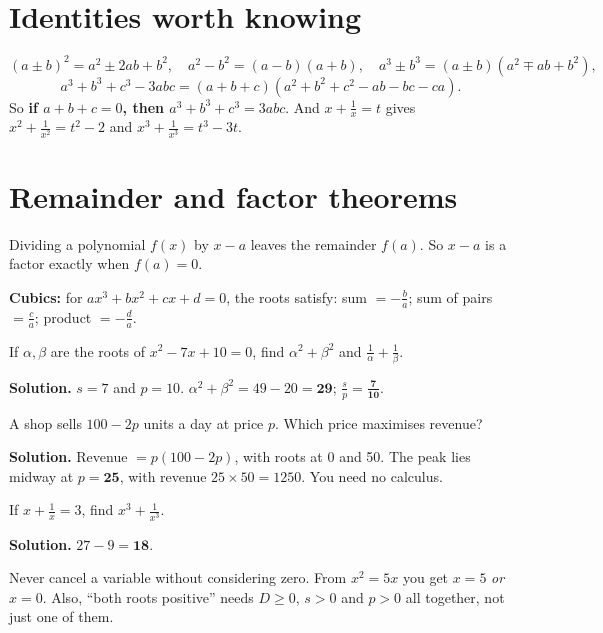 \documentclass[11pt,a4paper,openany]{report}
\begin{document}
\section{Identities worth knowing}
\[(a\pm b)^2=a^2\pm2ab+b^2,\quad a^2-b^2=(a-b)(a+b),\quad a^3\pm b^3=(a\pm b)(a^2\mp ab+b^2),\]
\[a^3+b^3+c^3-3abc=(a+b+c)(a^2+b^2+c^2-ab-bc-ca).\]
So \textbf{if $a+b+c=0$, then $a^3+b^3+c^3=3abc$}. And $x+\frac1x=t$ gives $x^2+\frac1{x^2}=t^2-2$ and $x^3+\frac1{x^3}=t^3-3t$.

\section{Remainder and factor theorems}
Dividing a polynomial $f(x)$ by $x-a$ leaves the remainder $f(a)$. So $x-a$ is a factor exactly when $f(a)=0$.

\textbf{Cubics:} for $ax^3+bx^2+cx+d=0$, the roots satisfy: sum $=-\frac ba$; sum of pairs $=\frac ca$; product $=-\frac da$.

\begin{example}
If $\alpha,\beta$ are the roots of $x^2-7x+10=0$, find $\alpha^2+\beta^2$ and $\frac1\alpha+\frac1\beta$.

\textbf{Solution.} $s=7$ and $p=10$. $\alpha^2+\beta^2=49-20=\mathbf{29}$; $\frac sp=\mathbf{\frac7{10}}$.
\end{example}

\begin{example}
A shop sells $100-2p$ units a day at price $p$. Which price maximises revenue?

\textbf{Solution.} Revenue $=p(100-2p)$, with roots at 0 and 50. The peak lies midway at $p=\mathbf{25}$, with revenue $25\times50=1250$. You need no calculus.
\end{example}

\begin{example}
If $x+\frac1x=3$, find $x^3+\frac1{x^3}$.

\textbf{Solution.} $27-9=\mathbf{18}$.
\end{example}

\begin{trap}
Never cancel a variable without considering zero. From $x^2=5x$ you get $x=5$ \emph{or} $x=0$. Also, ``both roots positive'' needs $D\ge0$, $s>0$ and $p>0$ all together, not just one of them.
\end{trap}
\end{document}
